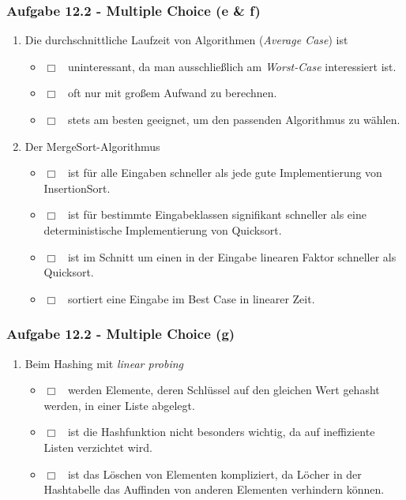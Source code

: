 \documentclass{beamer}
\begin{document}
\begin{frame}[t]
	\frametitle{Aufgabe 12.2 - Multiple Choice (e \& f)}
	\small
	\begin{enumerate}[label=\textcolor{black}{\alph*)},align=left,leftmargin=*,itemsep=1.5em,start=5]
		\item Die durchschnittliche Laufzeit von Algorithmen (\textit{Average Case}) ist
		      \begin{itemize}[label={},itemsep=3pt,align=left,leftmargin=*]
			      \item $\Box$ \, uninteressant, da man ausschließlich am \textit{Worst-Case} interessiert ist.
			      \item $\Box$ \, oft nur mit großem Aufwand zu berechnen.
			      \item $\Box$ \, stets am besten geeignet, um den passenden Algorithmus zu wählen.
		      \end{itemize}
		\item Der MergeSort-Algorithmus
		      \begin{itemize}[label={},itemsep=3pt,align=left,leftmargin=*]
			      \item $\Box$ \, ist für alle Eingaben schneller als jede gute Implementierung von InsertionSort.
			      \item $\Box$ \, ist für bestimmte Eingabeklassen signifikant schneller als eine deterministische Implementierung von Quicksort.
			      \item $\Box$ \, ist im Schnitt um einen in der Eingabe linearen Faktor schneller als Quicksort.
			      \item $\Box$ \, sortiert eine Eingabe im Best Case in linearer Zeit.
		      \end{itemize}
	\end{enumerate}
\end{frame}

\begin{frame}[t]
	\frametitle{Aufgabe 12.2 - Multiple Choice (g)}
	\small
	\begin{enumerate}[label=\textcolor{black}{\alph*)},align=left,leftmargin=*,itemsep=1em,start=7]
		\item Beim Hashing mit \textit{linear probing}
		      \begin{itemize}[label={},itemsep=3pt,align=left,leftmargin=*]
			      \item $\Box$ \, werden Elemente, deren Schlüssel auf den gleichen Wert gehasht werden, in einer Liste abgelegt.
			      \item $\Box$ \, ist die Hashfunktion nicht besonders wichtig, da auf ineffiziente Listen verzichtet wird.
			      \item $\Box$ \, ist das Löschen von Elementen kompliziert, da Löcher in der Hashtabelle das Auffinden von anderen Elementen verhindern können.
		      \end{itemize}
	\end{enumerate}
\end{frame}
\end{document}
